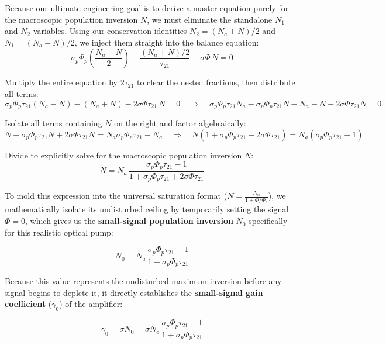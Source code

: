 Because our ultimate engineering goal is to derive a master equation purely for the macroscopic population inversion $N$, we must eliminate the standalone $N_1$ and $N_2$ variables. Using our conservation identities $N_2 = (N_a + N)/2$ and $N_1 = (N_a - N)/2$, we inject them straight into the balance equation:
\begin{equation*}
    \sigma_p\Phi_p\!\left(\frac{N_a - N}{2}\right) - \frac{(N_a + N)/2}{\tau_{21}} - \sigma\Phi\,N = 0
\end{equation*}

Multiply the entire equation by $2\tau_{21}$ to clear the nested fractions, then distribute all terms:
\begin{equation*}
    \sigma_p\Phi_p\tau_{21}(N_a - N) - (N_a + N) - 2\sigma\Phi\tau_{21}\,N = 0 \quad \Longrightarrow \quad \sigma_p\Phi_p\tau_{21}N_a - \sigma_p\Phi_p\tau_{21}N - N_a - N - 2\sigma\Phi\tau_{21}N = 0
\end{equation*}

Isolate all terms containing $N$ on the right and factor algebraically:
\begin{equation*}
    N + \sigma_p\Phi_p\tau_{21}N + 2\sigma\Phi\tau_{21}N = N_a\sigma_p\Phi_p\tau_{21} - N_a \quad \Longrightarrow \quad N\!\left(1 + \sigma_p\Phi_p\tau_{21} + 2\sigma\Phi\tau_{21}\right) = N_a(\sigma_p\Phi_p\tau_{21} - 1)
\end{equation*}

Divide to explicitly solve for the macroscopic population inversion $N$:
\begin{equation*}
    N = N_a\,\frac{\sigma_p\Phi_p\tau_{21} - 1}{1 + \sigma_p\Phi_p\tau_{21} + 2\sigma\Phi\tau_{21}}
\end{equation*}

To mold this expression into the universal saturation format ($N = \frac{N_0}{1 + \Phi/\Phi_s}$), we mathematically isolate its undisturbed ceiling by temporarily setting the signal $\Phi = 0$, which gives us the \textbf{small-signal population inversion} $N_0$ specifically for this realistic optical pump:
\begin{keyresult}
    \begin{equation}
        N_0 = N_a\,\frac{\sigma_p\Phi_p\tau_{21} - 1}{1 + \sigma_p\Phi_p\tau_{21}}
    \end{equation}
\end{keyresult}

Because this value represents the undisturbed maximum inversion before any signal begins to deplete it, it directly establishes the \textbf{small-signal gain coefficient} ($\gamma_0$) of the amplifier:
\begin{keyresult}
    \begin{equation}
        \gamma_0 = \sigma N_0 = \sigma N_a\,\frac{\sigma_p\Phi_p\tau_{21} - 1}{1 + \sigma_p\Phi_p\tau_{21}}
    \end{equation}
\end{keyresult}

